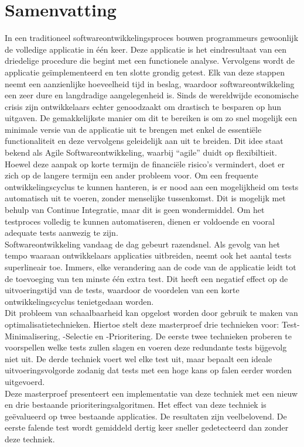 
\chapter*{Samenvatting}
In een traditioneel softwareontwikkelingsproces bouwen programmeurs gewoonlijk de volledige applicatie in één keer. Deze applicatie is het eindresultaat van een driedelige procedure die begint met een functionele analyse. Vervolgens wordt de applicatie ge\"implementeerd en ten slotte grondig getest. Elk van deze stappen neemt een aanzienlijke hoeveelheid tijd in beslag, waardoor softwareontwikkeling een zeer dure en langdradige aangelegenheid is. Sinds de wereldwijde economische crisis zijn ontwikkelaars echter genoodzaakt om drastisch te besparen op hun uitgaven. De gemakkelijkste manier om dit te bereiken is om zo snel mogelijk een minimale versie van de applicatie uit te brengen met enkel de essenti\"ele functionaliteit en deze vervolgens geleidelijk aan uit te breiden. Dit idee staat bekend als Agile Softwareontwikkeling, waarbij ``agile'' duidt op flexibiltieit.\\

\noindent Hoewel deze aanpak op korte termijn de financiële risico's vermindert, doet er zich op de langere termijn een ander probleem voor. Om een frequente ontwikkelingscyclus te kunnen hanteren, is er nood aan een mogelijkheid om tests automatisch uit te voeren, zonder menselijke tussenkomst. Dit is mogelijk met behulp van Continue Integratie, maar dit is geen wondermiddel. Om het testproces volledig te kunnen automatiseren, dienen er voldoende en vooral adequate tests aanwezig te zijn.\\

\noindent Softwareontwikkeling vandaag de dag gebeurt razendsnel. Als gevolg van het tempo waaraan ontwikkelaars applicaties uitbreiden, neemt ook het aantal tests superlineair toe. Immers, elke verandering aan de code van de applicatie leidt tot de toevoeging van ten minste één extra test. Dit heeft een negatief effect op de uitvoeringstijd van de tests, waardoor de voordelen van een korte ontwikkelingscyclus tenietgedaan worden.\\

\noindent Dit probleem van schaalbaarheid kan opgelost worden door gebruik te maken van optimalisatietechnieken. Hiertoe stelt deze masterproef drie technieken voor: Test-Minimalisering, -Selectie en -Prioritering. De eerste twee technieken proberen te voorspellen welke tests zullen slagen en voeren deze redundante tests bijgevolg niet uit. De derde techniek voert wel elke test uit, maar bepaalt een ideale uitvoeringsvolgorde zodanig dat tests met een hoge kans op falen eerder worden uitgevoerd.\\

\noindent Deze masterproef presenteert een implementatie van deze techniek met een nieuw en drie bestaande prioriteringsalgoritmen. Het effect van deze techniek is geëvalueerd op twee bestaande applicaties. De resultaten zijn veelbelovend. De eerste falende test wordt gemiddeld dertig keer sneller gedetecteerd dan zonder deze techniek.